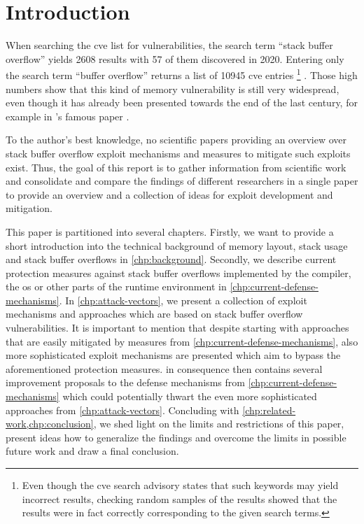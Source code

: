 \chapter{Introduction}
\label{chp:introduction}

When searching the \gls{cve} list \cite{MITRECorporation2020} for vulnerabilities, the search term ``stack buffer overflow'' yields 2608 results with 57 of them discovered in 2020.
Entering only the search term ``buffer overflow'' returns a list of 10945 \gls{cve} entries%
	\footnote{Even though the \gls{cve} search advisory states that such keywords may yield incorrect results, checking random samples of the results showed that the results were in fact correctly corresponding to the given search terms.}%
.
Those high numbers show that this kind of memory vulnerability is still very widespread, even though it has already been presented towards the end of the last century, for example in \citeauthor{AlephOne1996}'s famous paper  \cite{AlephOne1996}.

To the author's best knowledge, no scientific papers providing an overview over stack buffer overflow exploit mechanisms and measures to mitigate such exploits exist.
Thus, the goal of this report is to gather information from scientific work and consolidate and compare the findings of different researchers in a single paper to provide an overview and a collection of ideas for exploit development and mitigation.

This paper is partitioned into several chapters.
Firstly, we want to provide a short introduction into the technical background of memory layout, stack usage and stack buffer overflows in \cref{chp:background}.
Secondly, we describe current protection measures against stack buffer overflows implemented by the compiler, the \gls{os} or other parts of the runtime environment in \cref{chp:current-defense-mechanisms}.
In \cref{chp:attack-vectors}, we present a collection of exploit mechanisms and approaches which are based on stack buffer overflow vulnerabilities.
It is important to mention that despite starting with approaches that are easily mitigated by measures from \cref{chp:current-defense-mechanisms}, also more sophisticated exploit mechanisms are presented which aim to bypass the aforementioned protection measures.
 in consequence then contains several improvement proposals to the defense mechanisms from \cref{chp:current-defense-mechanisms} which could potentially thwart the even more sophisticated approaches from \cref{chp:attack-vectors}.
Concluding with \cref{chp:related-work,chp:conclusion}, we shed light on the limits and restrictions of this paper, present ideas how to generalize the findings and overcome the limits in possible future work and draw a final conclusion.

